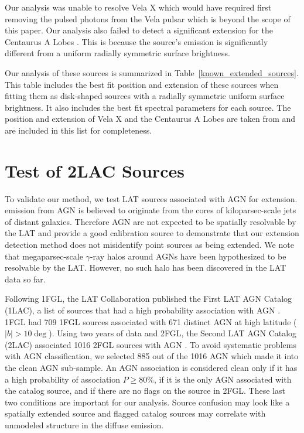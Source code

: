\documentclass[12pt,preprint]{aastex}
\newcommand{\gev}{\text{GeV}\xspace}
\begin{document}
Our analysis was unable to resolve Vela X which would have required first
removing the pulsed photons from the Vela pulsar which is beyond the
scope of this paper.  Our analysis also failed to detect a significant
extension for the Centaurus A Lobes \citep{cen_a_lat}. This is because
the source's emission is significantly different from a uniform
radially symmetric surface brightness.

Our analysis of these sources is summarized in
Table~\ref{known_extended_sources}.  This table includes the best fit
position and extension of these sources when fitting them as disk-shaped
sources with a radially symmetric uniform surface brightness. It also
includes the best fit spectral parameters for each source.  The position
and extension of Vela X and the Centaurus A Lobes are taken from
\cite{velax,cen_a_lat} and are included in this list for completeness.

\section{Test of 2LAC Sources}
\label{test_2lac_sources}

To validate our method, we test LAT sources associated with AGN for
extension.  \gev emission from AGN is believed to originate from the
cores of kiloparsec-scale jets of distant galaxies.  Therefore AGN are
not expected to be spatially resolvable by the LAT and provide a good
calibration source to demonstrate that our extension detection method
does not misidentify point sources as being extended.  We note that
megaparsec-scale $\gamma$-ray halos around AGNs have been hypothesized
\citep{pair_halo_paper} to be resolvable by the LAT. However, no such
halo has been discovered in the LAT data so far.

Following 1FGL, the LAT Collaboration published the First LAT AGN Catalog
(1LAC), a list of sources that had a high probability association with
AGN \citep{first_agn_cat}.  1FGL had 709 1FGL sources associated with 671
distinct AGN at high latitude ($|b|>10\deg$).  Using two years of data
and 2FGL, the Second LAT AGN Catalog (2LAC) associated 1016 2FGL sources
with AGN \citep{second_agn_cat}.  To avoid systematic problems with AGN
classification, we selected 885 out of the 1016 AGN which made it into
the clean AGN sub-sample.  An AGN association is considered clean only
if it has a high probability of association $P\ge 80\%$, if it is the
only AGN associated with the catalog source, and if there are no flags
on the source in 2FGL. These last two conditions are important for our
analysis. Source confusion may look like a spatially extended source
and flagged catalog sources may correlate with unmodeled structure in
the diffuse emission.
\end{document}
